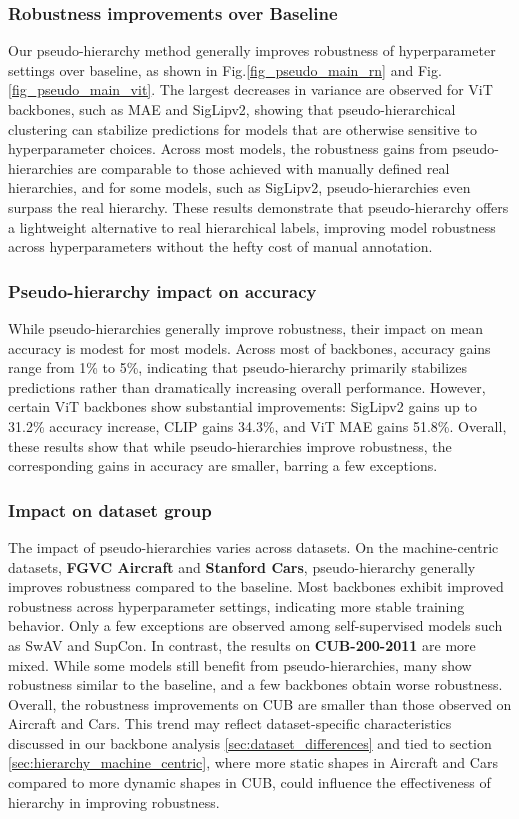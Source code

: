 \documentclass[10pt,twocolumn,letterpaper]{article}
\begin{document}
\subsubsection{Robustness improvements over Baseline}
Our pseudo-hierarchy method generally improves robustness of hyperparameter settings over baseline, as shown in Fig.\ref{fig_pseudo_main_rn} and Fig.\ref{fig_pseudo_main_vit}. The largest decreases in variance are observed for ViT backbones, such as MAE and SigLipv2, showing that pseudo-hierarchical clustering can stabilize predictions for models that are otherwise sensitive to hyperparameter choices. Across most models, the robustness gains from pseudo-hierarchies are comparable to those achieved with manually defined real hierarchies, and for some models, such as SigLipv2, pseudo-hierarchies even surpass the real hierarchy. These results demonstrate that pseudo-hierarchy offers a lightweight alternative to real hierarchical labels, improving model robustness across hyperparameters without the hefty cost of manual annotation.

\subsubsection{Pseudo-hierarchy impact on accuracy}
While pseudo-hierarchies generally improve robustness, their impact on mean accuracy is modest for most models. Across most of backbones, accuracy gains range from 1\% to 5\%, indicating that pseudo-hierarchy primarily stabilizes predictions rather than dramatically increasing overall performance. However, certain ViT backbones show substantial improvements: SigLipv2 gains up to 31.2\% accuracy increase, CLIP gains 34.3\%, and ViT MAE gains 51.8\%. Overall, these results show that while pseudo-hierarchies improve robustness, the corresponding gains in accuracy are smaller, barring a few exceptions.

\subsubsection{Impact on dataset group}
The impact of pseudo-hierarchies varies across datasets. On the machine-centric datasets, \textbf{FGVC Aircraft} and \textbf{Stanford Cars}, pseudo-hierarchy generally improves robustness compared to the baseline. Most backbones exhibit improved robustness across hyperparameter settings, indicating more stable training behavior. Only a few exceptions are observed among self-supervised models such as SwAV and SupCon. In contrast, the results on \textbf{CUB-200-2011} are more mixed. While some models still benefit from pseudo-hierarchies, many show robustness similar to the baseline, and a few backbones obtain worse robustness. Overall, the robustness improvements on CUB are smaller than those observed on Aircraft and Cars. This trend may reflect dataset-specific characteristics discussed in our backbone analysis \ref{sec:dataset_differences} and tied to section \ref{sec:hierarchy_machine_centric}, where more static shapes in Aircraft and Cars compared to more dynamic shapes in CUB, could influence the effectiveness of hierarchy in improving robustness.
\end{document}
